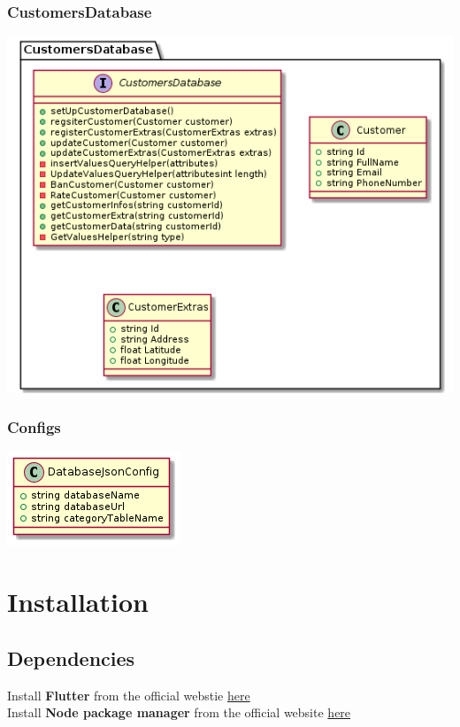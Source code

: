 \documentclass{article}
\begin{document}
\subsubsection{CustomersDatabase}
\includegraphics[scale=0.75]{./out/NodeApp/Database/CustomersDatabase.png}

\subsubsection{Configs}
\includegraphics[scale=1]{./out/NodeApp/Database/SharedConfigFile.png}


\section{Installation}
\subsection{Dependencies}
Install \textbf{Flutter} from the official webstie \href{https://docs.flutter.dev/get-started/install}{here}\\
Install \textbf{Node package manager} from the official website \href{https://docs.npmjs.com/downloading-and-installing-node-js-and-npm}{here}\\
\end{document}
